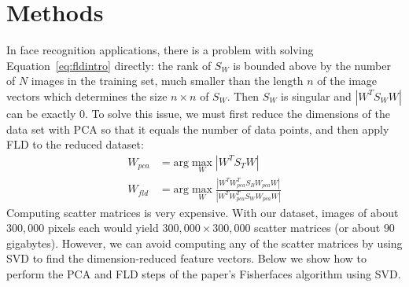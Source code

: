 \documentclass{amsart}
\theoremstyle{definition}
\theoremstyle{remark}
\begin{document}


\section{Methods}
In face recognition applications, there is a problem with solving Equation~\ref{eq:fldintro} directly: the rank of $S_W$ is bounded above by the number of $N$ images in the training set, much smaller than the length $n$ of the image vectors which determines the size $n\times n$ of $S_W$. Then $S_W$ is singular and $|W^TS_WW|$ can be exactly $0$. To solve this issue, we must first reduce the dimensions of the data set with PCA so that it equals the number of data points, and then apply FLD to the reduced dataset: 
\begin{align*}
	W_{pca} &= \text{arg}\max\limits_W|W^TS_TW|\\
	W_{fld} &= \text{arg}\max\limits_W\frac{|W^TW_{pca}^TS_BW_{pca}W|}{|W^TW_{pca}^TS_WW_{pca}W|}
\end{align*}
Computing scatter matrices is very expensive. With our dataset, images of about $300,000$ pixels each would yield $300,000\times 300,000$ scatter matrices (or about $90$ gigabytes). However, we can avoid computing any of the scatter matrices by using SVD to find the dimension-reduced feature vectors. Below we show how to perform the PCA and FLD steps of the paper's Fisherfaces algorithm using SVD. 
\end{document}
